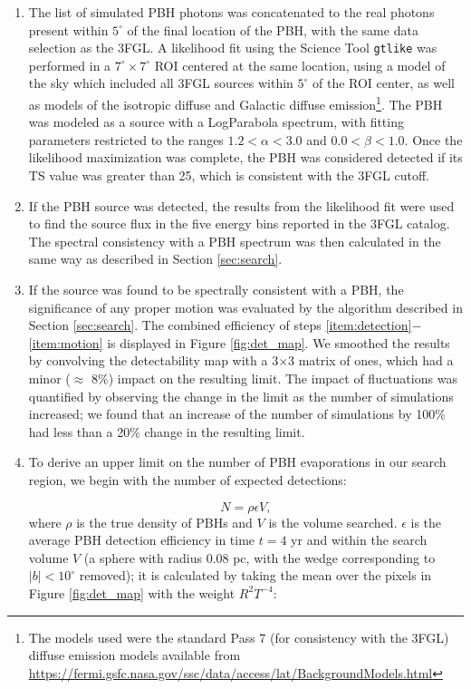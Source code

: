 \begin{enumerate}
\item
\label{item:detection}
The list of simulated PBH photons was concatenated to the real photons present within $5^\circ$ of the final location of the PBH, with the same data selection as the 3FGL. A likelihood fit using the \Fermi Science Tool {\tt gtlike} was performed in a $7^{\circ}\times7^{\circ}$ ROI centered at the same location, using a model of the sky which included all 3FGL sources within $5^\circ$ of the ROI center, as well as models of the isotropic diffuse and Galactic diffuse emission\footnote{The models used were the standard Pass 7 (for consistency with the 3FGL) diffuse emission models available from \url{https://fermi.gsfc.nasa.gov/ssc/data/access/lat/BackgroundModels.html}}. The PBH was modeled as a source with a LogParabola spectrum, with fitting parameters restricted to the ranges $1.2<\alpha<3.0$ and $0.0<\beta<1.0$. Once the likelihood maximization was complete, the PBH was considered detected if its TS value was greater than 25, which is consistent with the 3FGL cutoff.
\item
\label{item:spectrum}
If the PBH source was detected, the results from the likelihood fit were used to find the source flux in the five energy bins reported in the 3FGL catalog. The spectral consistency with a PBH spectrum was then calculated in the same way as described in Section \ref{sec:search}.
\item 
\label{item:motion}
If the source was found to be spectrally consistent with a PBH, the significance of any proper motion was evaluated by the algorithm described in Section \ref{sec:search}. The combined efficiency of steps \ref{item:detection}$-$\ref{item:motion} is displayed in Figure \ref{fig:det_map}. We smoothed the results by convolving the detectability map with a 3$\times$3 matrix of ones, which had a minor ($\approx$ 8\%) impact on the resulting limit. The impact of fluctuations was quantified by observing the change in the limit as the number of simulations increased; we found that an increase of the number of simulations by 100\% had less than a 20\% change in the resulting limit.
\item 

\label{step:eff}
To derive an upper limit on the number of PBH evaporations in our search region, we begin with the number of expected detections:

\noindent
\begin{equation}
\label{eq:N_det}
N = \rho \epsilon V,
\end{equation}
where $\rho$ is the true density of PBHs and $V$ is the volume searched.
$\epsilon$ is the average PBH detection efficiency in time $t = 4$ yr and within the search volume $V$ (a sphere with radius 0.08 pc, with the wedge corresponding to $|b|<10^\circ$ removed); 
it is calculated by taking the mean over the pixels in Figure \ref{fig:det_map} with the weight $R^2 T^{-4}$:



\end{enumerate}
